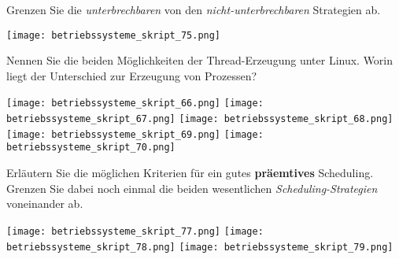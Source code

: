 \documentclass{article}
\begin{document}
\begin{tcolorbox}[colback=white!10!white,colframe=lightgray!75!black,
  savelowerto=\jobname_ex.tex]

\begin{center}
Grenzen Sie die 
\textit{unterbrechbaren
} von den 
\textit{nicht-unterbrechbaren
} Strategien ab.

\end{center}

\tcblower

\justifying
\texttt{[image: betriebssysteme\_skript\_75.png]}

\end{tcolorbox}
\begin{tcolorbox}[colback=white!10!white,colframe=lightgray!75!black,
  savelowerto=\jobname_ex.tex]

\begin{center}
Nennen Sie die beiden Möglichkeiten der Thread-Erzeugung unter Linux. 
Worin liegt der Unterschied zur Erzeugung von Prozessen?

\end{center}

\tcblower

\justifying
\texttt{[image: betriebssysteme\_skript\_66.png]}
\texttt{[image: betriebssysteme\_skript\_67.png]}
\texttt{[image: betriebssysteme\_skript\_68.png]}
\texttt{[image: betriebssysteme\_skript\_69.png]}
\texttt{[image: betriebssysteme\_skript\_70.png]}

\end{tcolorbox}
\begin{tcolorbox}[colback=white!10!white,colframe=lightgray!75!black,
  savelowerto=\jobname_ex.tex]

\begin{center}
Erläutern Sie die möglichen Kriterien für ein gutes 
\textbf{präemtives
} Scheduling. Grenzen Sie dabei noch einmal die beiden wesentlichen 
\textit{Scheduling-Strategien
} voneinander ab.

\end{center}

\tcblower

\justifying
\texttt{[image: betriebssysteme\_skript\_77.png]}
\texttt{[image: betriebssysteme\_skript\_78.png]}
\texttt{[image: betriebssysteme\_skript\_79.png]}

\end{tcolorbox}
\end{document}
